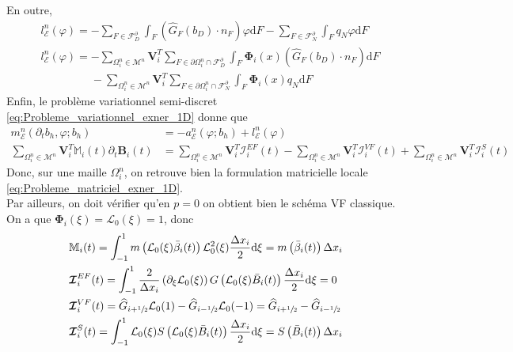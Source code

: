 \documentclass[11pt, a4paper, oneside]{report}
\begin{document}
En outre,
\begin{equation}
    \begin{aligned}
        &l_\mathcal{E}^n(\varphi) = - \sum_{F \in \mathcal{F}_D^\partial} \int_F \left( \widehat{G}_F(b_D) \cdot n_F \right) \varphi \text{d}F - \sum_{F \in \mathcal{F}_N^\partial} \int_F q_N \varphi \text{d}F \\
        &l_\mathcal{E}^n(\varphi) = - \sum_{\Omega_i^n \in \mathcal{M}^n} \bm{V}_i^T \sum_{F \in \partial \Omega_i^n \cap \mathcal{F}_D^\partial} \int_F \bm{\Phi}_i(x) \left( \widehat{G}_F(b_D) \cdot n_F \right) \text{d}F \\
        &\phantom{l_\mathcal{E}^n(\varphi) = } - \sum_{\Omega_i^n \in \mathcal{M}^n} \bm{V}_i^T \sum_{F \in \partial \Omega_i^n \cap \mathcal{F}_N^\partial} \int_F \bm{\Phi}_i(x) q_N \text{d}F
    \end{aligned}
\end{equation}
Enfin, le problème variationnel semi-discret \eqref{eq:Probleme_variationnel_exner_1D} donne que
\begin{equation}
    \begin{aligned}
        m_\mathcal{E}^n(\partial_t b_h, \varphi; b_h) & = - a_\mathcal{E}^n(\varphi; b_h) + l_\mathcal{E}^n(\varphi) \\
        \sum_{\Omega_i^n \in \mathcal{M}^n} \bm{V}_i^T \mathbb{M}_i(t) \partial_t \bm{B}_i(t) & = \sum_{\Omega_i^n \in \mathcal{M}^n} \bm{V}_i^T \bm{\mathcal{I}}_i^{EF}(t) - \sum_{\Omega_i^n \in \mathcal{M}^n} \bm{V}_i^T \bm{\mathcal{I}}_i^{VF}(t) + \sum_{\Omega_i^n \in \mathcal{M}^n} \bm{V}_i^T \bm{\mathcal{I}}_i^S(t)
    \end{aligned}
\end{equation}
Donc, sur une maille $\Omega_i^n$, on retrouve bien la formulation matricielle locale \eqref{eq:Probleme_matriciel_exner_1D}. \\
Par ailleurs, on doit vérifier qu'en $p = 0$ on obtient bien le schéma VF classique. \\
On a que $\bm{\Phi}_i(\xi) = \mathcal{L}_0(\xi) = 1$, donc
\begin{equation}
    \begin{aligned}
        &\mathbb{M}_i(t) = \int_{-1}^1 m \left( \mathcal{L}_0(\xi) \bar{\beta}_i(t) \right) \mathcal{L}_0^2(\xi) \frac{\Delta x_i}{2} \text{d}\xi = m \left( \bar{\beta}_i(t) \right) \Delta x_i \\
        &\bm{\mathcal{I}}_i^{EF}(t) = \int_{-1}^1 \frac{2}{\Delta x_i} \left( \partial_\xi \mathcal{L}_0(\xi) \right) G \left( \mathcal{L}_0(\xi) \bar{B}_i(t) \right) \frac{\Delta x_i}{2} \text{d}\xi = 0 \\
        &\bm{\mathcal{I}}_i^{VF}(t) = \widehat{G}_{i+\sfrac{1}{2}} \mathcal{L}_0(1) - \widehat{G}_{i-\sfrac{1}{2}} \mathcal{L}_0(-1) = \widehat{G}_{i+\sfrac{1}{2}} - \widehat{G}_{i-\sfrac{1}{2}} \\
        &\bm{\mathcal{I}}_i^S(t) = \int_{-1}^1 \mathcal{L}_0(\xi) S \left( \mathcal{L}_0(\xi) \bar{B}_i(t) \right) \frac{\Delta x_i}{2} \text{d}\xi = S \left( \bar{B}_i(t) \right) \Delta x_i
    \end{aligned}
\end{equation}
\end{document}
